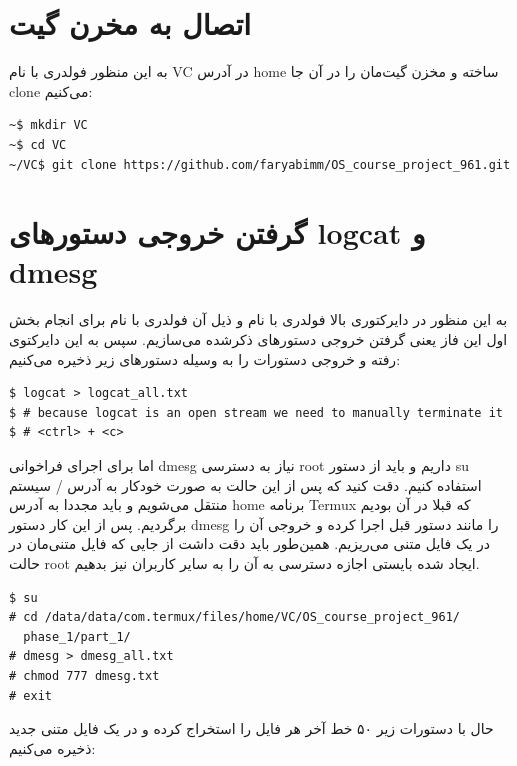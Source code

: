 \documentclass{article}
\begin{document}
\section*{اتصال به مخرن گیت}

به این منظور فولدری با نام VC در آدرس home ساخته و مخزن گیت‌مان را در آن جا clone می‌کنیم:

\begin{latin}
\begin{verbatim}
~$ mkdir VC
~$ cd VC
~/VC$ git clone https://github.com/faryabimm/OS_course_project_961.git
\end{verbatim}
\end{latin}

\section*{گرفتن خروجی دستور‌های logcat و dmesg}

به این منظور در دایرکتوری بالا فولدری با نام  و ذیل آن فولدری با نام  برای انجام بخش اول این فاز یعنی گرفتن خروجی دستور‌های ذکر‌شده می‌سازیم. سپس به این دایرکتوی رفته و خروجی دستورات را به وسیله دستور‌های زیر ذخیره می‌کنیم:

\begin{latin}
\begin{verbatim}
$ logcat > logcat_all.txt
$ # because logcat is an open stream we need to manually terminate it
$ # <ctrl> + <c>
\end{verbatim}
\end{latin}

اما برای اجرای فراخوانی dmesg نیاز به دسترسی root داریم و باید از دستور su استفاده کنیم. دقت کنید که پس از این حالت به صورت خودکار به آدرس / سیستم منتقل می‌شویم و باید مجددا به آدرس home برنامه Termux که قبلا در آن بودیم برگردیم. پس از این کار دستور dmesg را مانند دستور قبل اجرا کرده و خروجی آن را در یک فایل متنی می‌ریزیم. همین‌طور باید دقت داشت از جایی که فایل متنی‌مان در حالت root ایجاد شده بایستی اجازه دسترسی به آن را به سایر کاربران نیز بدهیم.

\begin{latin}
\begin{verbatim}
$ su
# cd /data/data/com.termux/files/home/VC/OS_course_project_961/
  phase_1/part_1/
# dmesg > dmesg_all.txt
# chmod 777 dmesg.txt
# exit
\end{verbatim}
\end{latin}

حال با دستورات زیر ۵۰ خط آخر هر فایل را استخراج کرده و در یک فایل متنی جدید ذخیره می‌کنیم:
\end{document}
